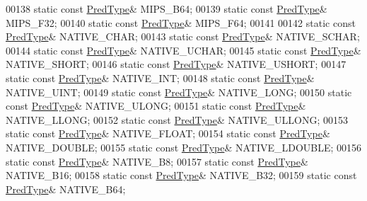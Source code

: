 \begin{DoxyCode}
00138         \textcolor{keyword}{static} \textcolor{keyword}{const} \hyperlink{class_h5_1_1_pred_type}{PredType}& MIPS\_B64;
00139         \textcolor{keyword}{static} \textcolor{keyword}{const} \hyperlink{class_h5_1_1_pred_type}{PredType}& MIPS\_F32;
00140         \textcolor{keyword}{static} \textcolor{keyword}{const} \hyperlink{class_h5_1_1_pred_type}{PredType}& MIPS\_F64;
00141 
00142         \textcolor{keyword}{static} \textcolor{keyword}{const} \hyperlink{class_h5_1_1_pred_type}{PredType}& NATIVE\_CHAR;
00143         \textcolor{keyword}{static} \textcolor{keyword}{const} \hyperlink{class_h5_1_1_pred_type}{PredType}& NATIVE\_SCHAR;
00144         \textcolor{keyword}{static} \textcolor{keyword}{const} \hyperlink{class_h5_1_1_pred_type}{PredType}& NATIVE\_UCHAR;
00145         \textcolor{keyword}{static} \textcolor{keyword}{const} \hyperlink{class_h5_1_1_pred_type}{PredType}& NATIVE\_SHORT;
00146         \textcolor{keyword}{static} \textcolor{keyword}{const} \hyperlink{class_h5_1_1_pred_type}{PredType}& NATIVE\_USHORT;
00147         \textcolor{keyword}{static} \textcolor{keyword}{const} \hyperlink{class_h5_1_1_pred_type}{PredType}& NATIVE\_INT;
00148         \textcolor{keyword}{static} \textcolor{keyword}{const} \hyperlink{class_h5_1_1_pred_type}{PredType}& NATIVE\_UINT;
00149         \textcolor{keyword}{static} \textcolor{keyword}{const} \hyperlink{class_h5_1_1_pred_type}{PredType}& NATIVE\_LONG;
00150         \textcolor{keyword}{static} \textcolor{keyword}{const} \hyperlink{class_h5_1_1_pred_type}{PredType}& NATIVE\_ULONG;
00151         \textcolor{keyword}{static} \textcolor{keyword}{const} \hyperlink{class_h5_1_1_pred_type}{PredType}& NATIVE\_LLONG;
00152         \textcolor{keyword}{static} \textcolor{keyword}{const} \hyperlink{class_h5_1_1_pred_type}{PredType}& NATIVE\_ULLONG;
00153         \textcolor{keyword}{static} \textcolor{keyword}{const} \hyperlink{class_h5_1_1_pred_type}{PredType}& NATIVE\_FLOAT;
00154         \textcolor{keyword}{static} \textcolor{keyword}{const} \hyperlink{class_h5_1_1_pred_type}{PredType}& NATIVE\_DOUBLE;
00155         \textcolor{keyword}{static} \textcolor{keyword}{const} \hyperlink{class_h5_1_1_pred_type}{PredType}& NATIVE\_LDOUBLE;
00156         \textcolor{keyword}{static} \textcolor{keyword}{const} \hyperlink{class_h5_1_1_pred_type}{PredType}& NATIVE\_B8;
00157         \textcolor{keyword}{static} \textcolor{keyword}{const} \hyperlink{class_h5_1_1_pred_type}{PredType}& NATIVE\_B16;
00158         \textcolor{keyword}{static} \textcolor{keyword}{const} \hyperlink{class_h5_1_1_pred_type}{PredType}& NATIVE\_B32;
00159         \textcolor{keyword}{static} \textcolor{keyword}{const} \hyperlink{class_h5_1_1_pred_type}{PredType}& NATIVE\_B64;

\end{DoxyCode}
